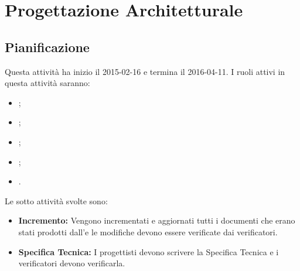 \documentclass[12pt,a4paper]{article}
\begin{document}
\section{Progettazione Architetturale} %

\subsection{Pianificazione}

Questa attività ha inizio il 2015-02-16 e termina il 2016-04-11. I ruoli attivi in questa attività saranno:
\begin{itemize}
	\item \PM;
	\item \AM;
	\item \AN;
    \item \PR;
    \item \VR.
\end{itemize}
Le sotto attività svolte sono:
\begin{itemize}
	\item \textbf{Incremento:} Vengono incrementati e aggiornati tutti i documenti che erano stati prodotti dall'\AdR e le modifiche devono essere verificate dai verificatori.
    \item \textbf{Specifica Tecnica:} I progettisti devono scrivere la Specifica Tecnica e i verificatori devono verificarla.
\end{itemize}
\end{document}
